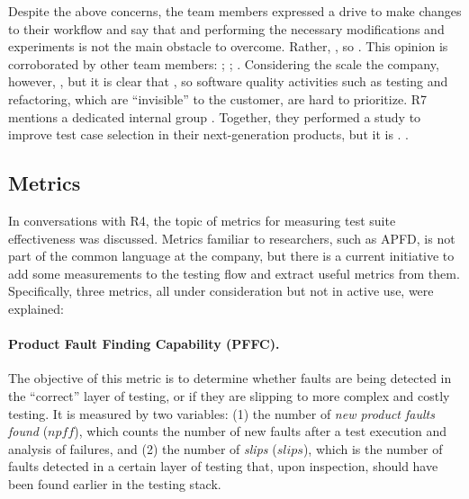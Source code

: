 Despite the above concerns, the team members expressed a drive to make changes to their workflow and say that  and performing the necessary modifications and experiments is not the main obstacle to overcome.
Rather, , so .
This opinion is corroborated by other team members: ; ; .
Considering the scale the company, however, , but it is clear that , so software quality activities such as testing and refactoring, which are ``invisible'' to the customer, are hard to prioritize.
R7 mentions a dedicated internal group .
Together, they performed a study to improve test case selection in their next-generation products, but it is .
.

\subsection{Metrics}

In conversations with R4, the topic of metrics for measuring test suite effectiveness was discussed.
Metrics familiar to researchers, such as APFD, is not part of the common language at the company, but there is a current initiative to add some measurements to the testing flow and extract useful metrics from them.
Specifically, three metrics, all under consideration but not in active use, were explained:

\paragraph{Product Fault Finding Capability (PFFC).}
The objective of this metric is to determine whether faults are being detected in the ``correct'' layer of testing, or if they are slipping to more complex and costly testing.
It is measured by two variables: (1) the number of \textit{new product faults found} ($npff$), which counts the number of new faults after a test execution and analysis of failures, and (2) the number of \textit{slips} ($slips$), which is the number of faults detected in a certain layer of testing that, upon inspection, should have been found earlier in the testing stack.

